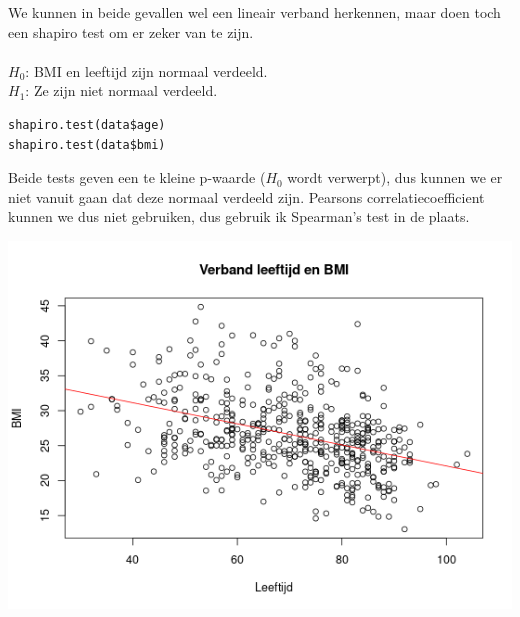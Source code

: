 \documentclass{article}
\begin{document}
\begin{figure}[h]%
    \centering
    \qquad
\end{figure}

We kunnen in beide gevallen wel een lineair verband herkennen, maar doen toch een shapiro test om er zeker van te zijn. \\ \\
$H_0$: BMI en leeftijd zijn normaal verdeeld.\\
$H_1$: Ze zijn niet normaal verdeeld.

\begin{verbatim}
shapiro.test(data$age)
shapiro.test(data$bmi)
\end{verbatim} 

Beide tests geven een te kleine p-waarde ($H_0$ wordt verwerpt), dus kunnen we er niet vanuit gaan dat deze normaal verdeeld zijn. Pearsons correlatiecoefficient kunnen we dus niet gebruiken, dus gebruik ik Spearman's test in de plaats.

\begin{center}
    \includegraphics[scale=0.5]{output/linreg-scatter.png}
\end{center}
\end{document}
